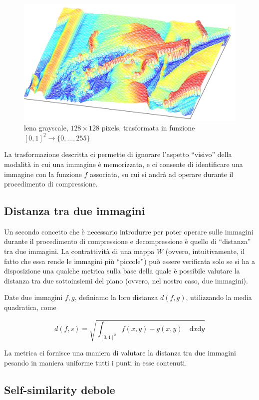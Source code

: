 \documentclass[11pt,a4paper,appendixprefix=true,numbers=noenddot]{scrreprt}
\begin{document}
\begin{figure}[!ht]
\centering
\includegraphics[scale=0.6]{images/lena-mash.pdf} 
\caption{lena grayscale, $128 \times 128$ pixels, trasformata in funzione $[0,1]^2 \rightarrow \{0,\ldots,255 \}$}
\end{figure}

La trasformazione descritta ci permette di ignorare l'aspetto ``visivo'' della modalità in cui una immagine è memorizzata, e ci consente di identificare una immagine con la funzione $f$ associata, su cui si andrà ad operare durante il procedimento di compressione.

\subsection*{Distanza tra due immagini}

Un secondo concetto che è necessario introdurre per poter operare sulle immagini durante il procedimento di compressione e decompressione è quello di ``distanza'' tra due immagini. La contrattività di una mappa $W$ (ovvero, intuitivamente, il fatto che essa rende le immagini più ``piccole'') può essere verificata solo se si ha a disposizione una qualche metrica sulla base della quale è possibile valutare la distanza tra due sottoinsiemi del piano (ovvero, nel nostro caso, due immagini).

Date due immagini $f, g$, definiamo la loro distanza $d(f, g)$, utilizzando la media quadratica, come

\[
d(f,s) = \sqrt{\int_{[0,1]^2} f(x,y) - g(x,y) \quad \text{d}x\text{d}y }
\]

La metrica ci fornisce una maniera di valutare la distanza tra due immagini pesando in maniera uniforme tutti i punti in esse contenuti.

\subsection*{Self-similarity debole}
\end{document}
